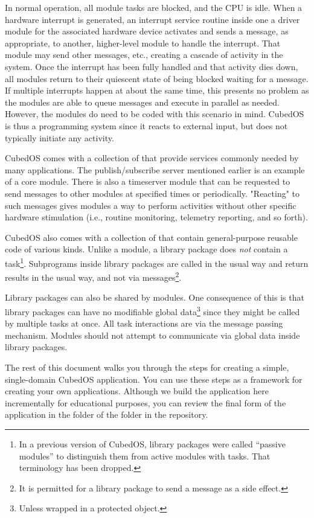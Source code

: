In normal operation, all module tasks are blocked, and the CPU is idle. When a hardware
interrupt is generated, an interrupt service routine inside one a driver module for the
associated hardware device activates and sends a message, as appropriate, to another,
higher-level module to handle the interrupt. That module may send other messages, etc., creating
a cascade of activity in the system. Once the interrupt has been fully handled and that activity
dies down, all modules return to their quiescent state of being blocked waiting for a message.
If multiple interrupts happen at about the same time, this presents no problem as the modules
are able to queue messages and execute in parallel as needed. However, the modules do need to be
coded with this scenario in mind. CubedOS is thus a  programming system since
it reacts to external input, but does not typically initiate any activity.

CubedOS comes with a collection of  that provide services commonly needed
by many applications. The publish/subscribe server mentioned earlier is an example of a core
module. There is also a timeserver module that can be requested to send messages to other
modules at specified times or periodically. "Reacting" to such messages gives modules a way to
perform activities without other specific hardware stimulation (i.e., routine monitoring,
telemetry reporting, and so forth).

CubedOS also comes with a collection of  that contain general-purpose
reusable code of various kinds. Unlike a module, a library package does \emph{not} contain a
task\footnote{In a previous version of CubedOS, library packages were called ``passive modules''
to distinguish them from active modules with tasks. That terminology has been dropped.}.
Subprograms inside library packages are called in the usual way and return results in the usual
way, and not via messages\footnote{It is permitted for a library package to send a message as a
side effect.}.

Library packages can also be shared by modules. One consequence of this is that library packages
can have no modifiable global data\footnote{Unless wrapped in a protected object.} since they
might be called by multiple tasks at once. All task interactions are via the message passing
mechanism. Modules should not attempt to communicate via global data inside library packages.

The rest of this document walks you through the steps for creating a simple, single-domain
CubedOS application. You can use these steps as a framework for creating your own applications.
Although we build the application here incrementally for educational purposes, you can review
the final form of the application in the  folder of the 
folder in the repository.

